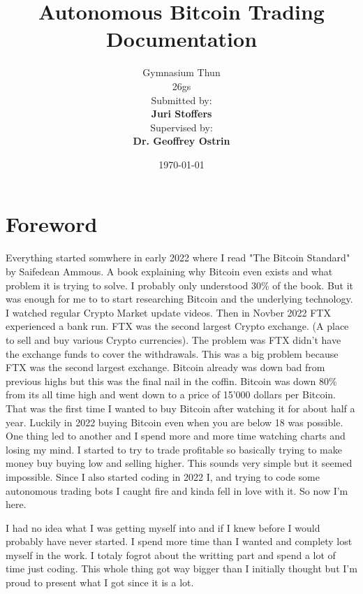 \documentclass[12pt]{article}
\title{\Huge Autonomous Bitcoin Trading\\\vspace{1cm}\Large Documentation}
\author{
    \Large Gymnasium Thun\\
     26gs\\
    \vspace{1cm}
    \Large Submitted by:\\
    \vspace{0.5cm}
    \textbf{Juri Stoffers}\\
    \vspace{2cm}
    \Large Supervised by:\\
    \vspace{0.5cm}
    \textbf{Dr. Geoffrey Ostrin}
}
\date{\Large \today}
\begin{document}
\begin{titlepage}
\maketitle
\end{titlepage}

\newpage
{}
\tableofcontents
\newpage




\section{Foreword}
Everything started somwhere in early 2022 where I read "The Bitcoin Standard" by Saifedean Ammous. A book explaining why Bitcoin even exists and what problem it is trying to solve. I probably only understood 30\% of the book. But it was enough for me to to start researching Bitcoin and the underlying technology. I watched regular Crypto Market update videos. Then in Novber 2022 FTX experienced a bank run.
FTX was the second largest Crypto exchange. (A place to sell and buy various Crypto currencies). The problem was FTX didn't have the exchange funds to cover the withdrawals. This was a big problem because FTX was the second largest exchange. Bitcoin already was down bad from previous highs but this was the final nail in the coffin. Bitcoin was down 80\% from its all time high and went down to a price of 15'000 dollars per Bitcoin. 
That was the first time I wanted to buy Bitcoin after watching it for about half a year. Luckily in 2022 buying Bitcoin even when you are below 18 was possible.
One thing led to another and I spend more and more time watching charts and losing my mind. I started to try to trade profitable so basically trying to make money buy buying low and selling higher. 
This sounds very simple but it seemed impossible. Since I also started coding in 2022 I, and trying to code some autonomous trading bots I caught fire and kinda fell in love with it.
So now I'm here.

I had no idea what I was getting myself into and if I knew before I would probably have never started. I spend more time than I wanted and complety lost myself in the work. I totaly fogrot about the writting part and spend a lot of time just coding. This whole thing got way bigger than I initially thought but I'm proud to present what I got since it is a lot.
\end{document}
